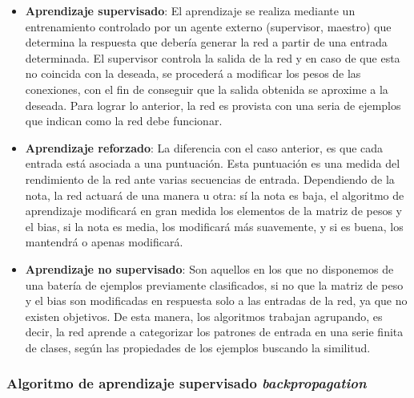 \begin{itemize}
    \item \textbf{Aprendizaje supervisado}: El aprendizaje se realiza mediante un entrenamiento controlado por un agente externo (supervisor, maestro) que determina la respuesta que debería generar la red a partir de una entrada determinada. El supervisor controla la salida de la red y en caso de que esta no coincida con la deseada, se procederá a modificar los pesos de las conexiones, con el fin de conseguir que la salida obtenida se aproxime a la deseada. Para lograr lo anterior, la red es provista con una seria de ejemplos que indican como la red debe funcionar.
    \item \textbf{Aprendizaje reforzado}: La diferencia con el caso anterior, es que cada entrada está asociada a una puntuación. Esta puntuación es una medida del rendimiento de la red ante varias secuencias de entrada. Dependiendo de la nota, la red actuará de una manera u otra: sí la nota es baja, el algoritmo de aprendizaje modificará en gran medida los elementos de la matriz de pesos y el bias, si la nota es media, los modificará más suavemente, y si es buena, los mantendrá o apenas modificará.
    \item \textbf{Aprendizaje no supervisado}: Son aquellos en los que no disponemos de una batería de ejemplos previamente clasificados, si no que la matriz de peso y el bias son modificadas en respuesta solo a las entradas de la red, ya que no existen objetivos. De esta manera, los algoritmos trabajan agrupando, es decir, la red aprende a categorizar los patrones de entrada en una serie finita de clases, según las propiedades de los ejemplos buscando la similitud.
\end{itemize}

\subsubsection{Algoritmo de aprendizaje supervisado \textit{backpropagation}}

